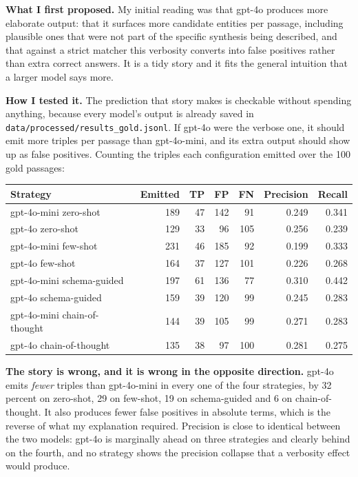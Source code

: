 \documentclass[11pt,a4paper,oneside]{report}
\begin{document}
\textbf{What I first proposed.} My initial reading was that gpt-4o produces more elaborate output: that it surfaces more candidate entities per passage, including plausible ones that were not part of the specific synthesis being described, and that against a strict matcher this verbosity converts into false positives rather than extra correct answers. It is a tidy story and it fits the general intuition that a larger model says more.

\textbf{How I tested it.} The prediction that story makes is checkable without spending anything, because every model's output is already saved in \texttt{data/\allowbreak{}processed/\allowbreak{}results\_\allowbreak{}gold.\allowbreak{}jsonl}. If gpt-4o were the verbose one, it should emit more triples per passage than gpt-4o-mini, and its extra output should show up as false positives. Counting the triples each configuration emitted over the 100 gold passages:

\par\medskip
\begingroup
\small\setlength{\tabcolsep}{6pt}
\begin{tabular}{@{}lrrrrrr@{}}
\toprule
\textbf{Strategy} & \textbf{Emitted} & \textbf{TP} & \textbf{FP} & \textbf{FN} & \textbf{Precision} & \textbf{Recall} \\
\midrule
gpt-4o-mini zero-shot & 189 & 47 & 142 & 91 & 0.249 & 0.341 \\
gpt-4o zero-shot & 129 & 33 & 96 & 105 & 0.256 & 0.239 \\
gpt-4o-mini few-shot & 231 & 46 & 185 & 92 & 0.199 & 0.333 \\
gpt-4o few-shot & 164 & 37 & 127 & 101 & 0.226 & 0.268 \\
gpt-4o-mini schema-guided & 197 & 61 & 136 & 77 & 0.310 & 0.442 \\
gpt-4o schema-guided & 159 & 39 & 120 & 99 & 0.245 & 0.283 \\
gpt-4o-mini chain-of-thought & 144 & 39 & 105 & 99 & 0.271 & 0.283 \\
gpt-4o chain-of-thought & 135 & 38 & 97 & 100 & 0.281 & 0.275 \\
\bottomrule
\end{tabular}
\endgroup
\par\medskip
\textbf{The story is wrong, and it is wrong in the opposite direction.} gpt-4o emits \emph{fewer} triples than gpt-4o-mini in every one of the four strategies, by 32 percent on zero-shot, 29 on few-shot, 19 on schema-guided and 6 on chain-of-thought. It also produces fewer false positives in absolute terms, which is the reverse of what my explanation required. Precision is close to identical between the two models: gpt-4o is marginally ahead on three strategies and clearly behind on the fourth, and no strategy shows the precision collapse that a verbosity effect would produce.
\end{document}

